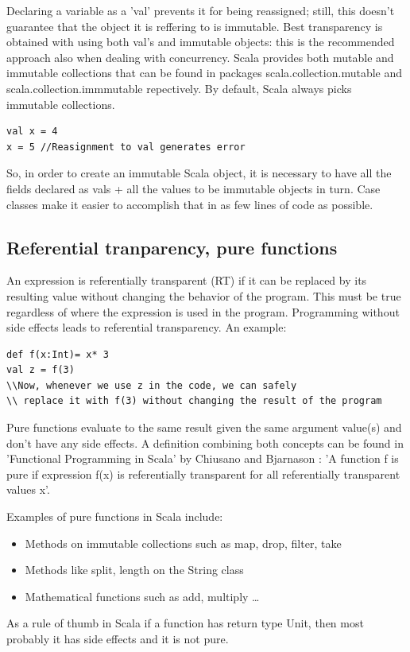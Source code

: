\documentclass{article}
\begin{document}
Declaring a variable as a 'val' prevents it for being reassigned; still, this doesn't guarantee that the object it is reffering to is immutable. Best transparency is obtained with using both val's and immutable objects: this is the recommended approach also when dealing with concurrency. Scala provides both mutable and immutable collections that can be found in packages scala.collection.mutable and scala.collection.immmutable repectively. By default, Scala always picks immutable collections. 

\begin{lstlisting} 
val x = 4
x = 5 //Reasignment to val generates error
\end{lstlisting}


So, in order to create an immutable Scala object, it is necessary to have all the fields declared as vals + all the values to be immutable objects in turn. Case classes make it easier to accomplish that in as few lines of code as possible.

\subsection {Referential tranparency, pure functions}
An expression is referentially transparent (RT) if it can be replaced by its resulting value without changing the behavior of the program. This must be true regardless of where the expression is used in the program. Programming without side effects leads to referential transparency. An example:

\begin{lstlisting}
def f(x:Int)= x* 3
val z = f(3)
\\Now, whenever we use z in the code, we can safely
\\ replace it with f(3) without changing the result of the program
\end{lstlisting}

Pure functions evaluate to the same result given the same argument value(s) and  don't have any side effects. A definition combining both concepts can be found in 'Functional Programming in Scala' by Chiusano and Bjarnason : 'A function f is pure if expression f(x) is referentially transparent for all referentially transparent values x'.\par
Examples of pure functions in Scala include:
\begin{itemize}

 \item Methods on immutable collections such as map, drop, filter, take
 \item Methods like split, length on the String class
 \item Mathematical functions such as add, multiply \ldots
\end{itemize}
As a rule of thumb in Scala if a function has return type Unit, then most probably it has side effects and it is not pure. \par
\end{document}

